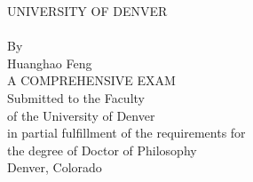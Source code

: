 \thispagestyle{empty}
\begin{center}
{\large UNIVERSITY OF DENVER\\
\vspace{1in} {\large \mytitleA} \\\vspace{1in}
By\\
\vspace{0.5in}
Huanghao Feng\\
\vspace{1.5in}
A COMPREHENSIVE EXAM\\
\vspace{0.5in}
Submitted to the Faculty\\
of the University of Denver\\
in partial fulfillment of the requirements for\\
the degree of Doctor of Philosophy\\
\vspace{1.5in}
Denver, Colorado\\
\vspace{0.1in} \mydate}
\end{center}

